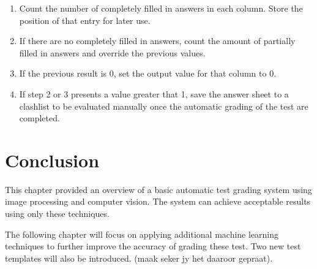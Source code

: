 \begin{enumerate}
\item Count the number of completely filled in answers in each column. Store the position of that entry for later use.
\item If there are no completely filled in answers, count the amount of partially filled in answers and override the previous values.
\item If the previous result is 0, set the output value for that column to 0.
\item If step 2 or 3 presents a value greater that 1, save the answer sheet to a clashlist to be evaluated manually once the automatic grading of the test are completed.
\end{enumerate}


\section{Conclusion}

This chapter provided an overview of a basic automatic test grading system using image processing and computer vision. The system can achieve acceptable results using only these techniques.

The following chapter will focus on applying additional machine learning techniques to further improve the accuracy of grading these test. Two new test templates will also be introduced. (maak seker jy het daaroor gepraat).